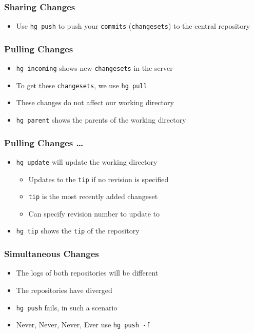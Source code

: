 \documentclass[14pt,compress]{beamer}
\newcommand{\typ}[1]{\lstinline{#1}}
\begin{document}
\begin{frame}
  \frametitle{Sharing Changes}
  \begin{itemize}
  \item Use \typ{hg push} to push your \typ{commits}
    (\typ{changesets}) to the central repository
  \end{itemize}
\end{frame}


\begin{frame}
  \frametitle{Pulling Changes}
  \begin{itemize}
  \item \typ{hg incoming} shows new \typ{changesets} in the server
  \item To get these \typ{changesets}, we use \typ{hg pull}
  \item These changes do not affect our working directory
  \item \typ{hg parent} shows the parents of the working directory
  \end{itemize}
\end{frame}

\begin{frame}
  \frametitle{Pulling Changes \ldots}
  \begin{itemize}
  \item \typ{hg update} will update the working directory
    \begin{itemize}
    \item Updates to the \typ{tip} if no revision is specified
    \item \typ{tip} is the most recently added changeset
    \item Can specify revision number to update to
    \end{itemize}
  \item \typ{hg tip} shows the \typ{tip} of the repository
  \end{itemize}
\end{frame}

\begin{frame}
  \frametitle{Simultaneous Changes}
  \begin{itemize}
  \item The logs of both repositories will be different
  \item The repositories have diverged
  \item \typ{hg push} fails, in such a scenario
  \item \alert{Never, Never, Never, Ever} use \typ{hg push -f}
  \end{itemize}
\end{frame}
\end{document}
